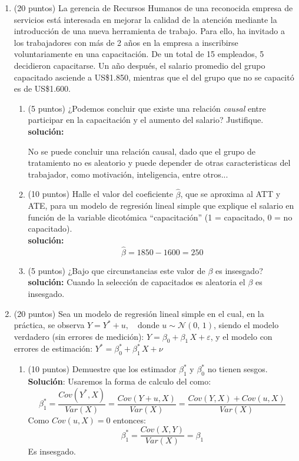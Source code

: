 \documentclass[10pt,a4paper]{article}
\begin{document}
\begin{enumerate}
    \item (20 puntos) La gerencia de Recursos Humanos de una reconocida empresa de servicios está interesada en mejorar la calidad de la atención mediante la introducción de una nueva herramienta de trabajo. Para ello, ha invitado a los trabajadores con más de 2 años en la empresa a inscribirse voluntariamente en una capacitación. De un total de 15 empleados, 5 decidieron capacitarse. Un año después, el salario promedio del grupo capacitado asciende a US\$1.850, mientras que el del grupo que no se capacitó es de US\$1.600.

\begin{enumerate}
    \item  (5 puntos) ¿Podemos concluir que existe una relación \textit{causal} entre participar en la capacitación y el aumento del salario? Justifique. \\

    \textbf{solución:}

    No se puede concluir una relación causal, dado que el grupo de tratamiento no es aleatorio y puede depender de otras caracteristicas del trabajador, como motivación, inteligencia, entre otros... \\

    \item  (10 puntos) Halle el valor del coeficiente $\hat{\beta}$, que se aproxima al ATT y ATE, para un modelo de regresión lineal simple que explique el salario en función de la variable dicotómica ``capacitación'' (1 = capacitado, 0 = no capacitado). \\

    \textbf{solución:}
    $$\hat{\beta} = 1850-1600 = 250$$

    \item (5 puntos) ¿Bajo que circunstancias este valor de $\beta$ es insesgado?\\

    \textbf{solución:}
    Cuando la selección de capacitados es aleatoria el $\beta$ es insesgado.
\\
    
\end{enumerate}

\item (20 puntos) Sea un modelo de regresión lineal simple en el cual, en la práctica, se observa $
Y = Y^* + u, \quad \text{donde } u \sim \mathcal{N}(0,\,1)$,
siendo el modelo verdadero (sin errores de medición): $
Y = \beta_0 + \beta_1 \, X + \varepsilon$, y el modelo con errores de estimación: $
Y^* = \beta^*_0 + \beta^*_1 \, X + \nu$
\begin{enumerate}
    \item (10 puntos) Demuestre que los estimador $\beta^*_1$ y $\beta^*_0$ no tienen sesgos.
    \\
    \textbf{Solución}: Usaremos la forma de calculo del como:
    $$\beta^*_1 = \frac{Cov(Y^*,X)}{Var(X)} = \frac{Cov(Y+u,X)}{Var(X)}=\frac{Cov(Y,X)+Cov(u,X)}{Var(X)}$$
    Como $Cov(u,X)=0$ entonces:
    $$\beta^*_1=\frac{Cov(X,Y)}{Var(X)}=\beta_1$$
    Es insesgado.


\end{enumerate}
\end{enumerate}
\end{document}
